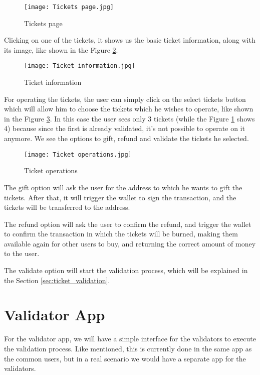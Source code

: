 \begin{figure}[H]
	\texttt{[image: Tickets page.jpg]}
	\centering
	\caption{Tickets page}
	\label{fig:tickets_page}
\end{figure}

Clicking on one of the tickets, it shows us the basic ticket information, along
with its image, like shown in the Figure \ref{fig:ticket_information}.

\begin{figure}[H]
	\texttt{[image: Ticket information.jpg]}
	\centering
	\caption{Ticket information}
	\label{fig:ticket_information}
\end{figure}

For operating the tickets, the user can simply click on the select tickets
button which will allow him to choose the tickets which he wishes to operate,
like shown in the Figure \ref{fig:ticket_operations}. In this case the user
sees only 3 tickets (while the Figure \ref{fig:tickets_page} shows 4) because
since the first is already validated, it's not possible to operate on it
anymore. We see the options to gift, refund and validate the tickets he
selected.

\begin{figure}[H]
	\texttt{[image: Ticket operations.jpg]}
	\centering
	\caption{Ticket operations}
	\label{fig:ticket_operations}
\end{figure}

The gift option will ask the user for the address to which he wants to gift the
tickets. After that, it will trigger the wallet to sign the transaction, and
the tickets will be transferred to the address.

The refund option will ask the user to confirm the refund, and trigger the
wallet to confirm the transaction in which the tickets will be burned, making
them available again for other users to buy, and returning the correct amount
of money to the user.

The validate option will start the validation process, which will be explained
in the Section \ref{sec:ticket_validation}.

\section{Validator App}
\label{sec:validator_app}

For the validator app, we will have a simple interface for the validators to
execute the validation process. Like mentioned, this is currently done in the
same app as the common users, but in a real scenario we would have a separate
app for the validators.


